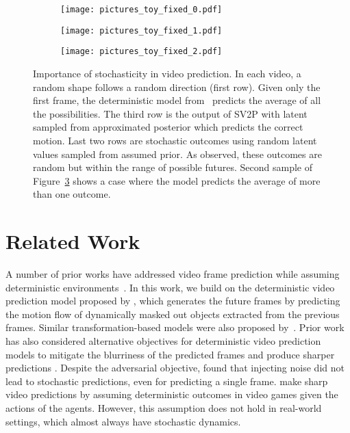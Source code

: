 \documentclass{article} \usepackage{iclr2018_conference,times}
\begin{document}
 
\begin{figure}[t]
\centering
\begin{subfigure}{.33\textwidth}
  \centering
  \texttt{[image: pictures\_toy\_fixed\_0.pdf]}
  \caption{}
  \label{fig:exp:toy:sub1}
\end{subfigure}\begin{subfigure}{.33\textwidth}
  \centering
  \texttt{[image: pictures\_toy\_fixed\_1.pdf]}
  \caption{}
  \label{fig:exp:toy:sub2}
\end{subfigure}\begin{subfigure}{.33\textwidth}
  \centering
  \texttt{[image: pictures\_toy\_fixed\_2.pdf]}
  \caption{}
  \label{fig:exp:toy:sub3}
\end{subfigure}
\caption{
Importance of stochasticity in video prediction. In each video, a random shape follows a random direction (first row). Given only the first frame, the deterministic model from~\cite{finn2016unsupervised} predicts the average of all the possibilities. The third row is the output of SV2P with latent sampled from approximated posterior which predicts the correct motion. Last two rows are stochastic outcomes using random latent values sampled from assumed prior. As observed, these outcomes are random but within the range of possible futures. Second sample of Figure~\ref{fig:exp:toy:sub3} shows a case where the model predicts the average of more than one outcome.}
\label{fig:exp:toy}
\end{figure}


%
 
\section{Related Work}
\label{related_work}
A number of prior works have addressed video frame prediction while assuming deterministic environments~\citep{ranzato2014video, srivastava2015unsupervised,vondrick2015anticipating,xingjian2015convolutional,boots2014learning, prednet}. In this work, we build on the deterministic video prediction model proposed by \citet{finn2016unsupervised}, which generates the future frames by predicting the motion flow of dynamically masked out objects extracted from the previous frames. Similar transformation-based models were also proposed by~\cite{de2016dynamic,liu2017video}. Prior work has also considered alternative objectives for deterministic video prediction models to mitigate the blurriness of the predicted frames and produce sharper predictions \citep{mathieu2015deep,vondrick2017generating}. Despite the adversarial objective, \cite{mathieu2015deep} found that injecting noise did not lead to stochastic predictions, even for predicting a single frame. \cite{oh2015action,chiappa2017recurrent} make sharp video predictions by assuming deterministic outcomes in video games given the actions of the agents. However, this assumption does not hold in real-world settings, which almost always have stochastic dynamics.
\end{document}
